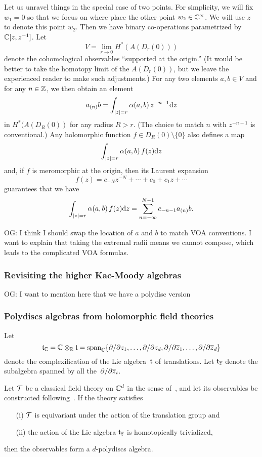 \documentclass[11pt]{amsart}
\def\owen#1{{\textcolor{violet!65!black}{OG: {#1}}}}
\begin{document}
Let us unravel things in the special case of two points.
For simplicity, we will fix $w_1 = 0$ so that we focus on where place the other point $w_2 \in \mathbb C^\times$.
We will use $z$ to denote this point $w_2$.
Then we have binary co-operations parametrized by $\mathbb C[z, z^{-1}]$.
Let 
\[
V = \lim_{r \to 0} H^*(A(D_r(0)))
\]
denote the cohomological observables ``supported at the origin.''
(It would be better to take the homotopy limit of the $A(D_r(0))$,
but we leave the experienced reader to make such adjustments.)
For any two elements $a, b \in V$ and for any $n \in \mathbb Z$,
we then obtain an element
\[
a_{(n)} b = \int_{|z| = r} \alpha(a,b)\, z^{-n-1} {\rm d} z
\]
in $H^*(A(D_R(0))$ for any radius $R > r$.
(The choice to match $n$ with $z^{-n-1}$ is conventional.)
Any holomorphic function $f \in D_R(0) \setminus \{0\}$ also defines a map
\[
\int_{|z| = r} \alpha(a,b)\, f(z) {\rm d} z 
\]
and, if $f$ is meromorphic at the origin, then its Laurent expansion
\[
f(z) = c_{-N} z^{-N} + \cdots + c_0 + c_1 z + \cdots
\]
guarantees that we have
\[
\int_{|z| = r} \alpha(a,b)\, f(z) {\rm d} z = \sum_{n=-\infty}^{N-1} c_{-n-1} a_{(n)} b.
\]

\owen{I think I should swap the location of $a$ and $b$ to match VOA conventions. I want to explain that taking the extremal radii means we cannot compose, which leads to the complicated VOA formulas.}

\subsubsection{Revisiting the higher Kac-Moody algebras}

\owen{I want to mention here that we have a polydisc version}

\subsubsection{Polydiscs algebras from holomorphic field theories}

Let 
\[
\mathfrak t_\mathbb C = \mathbb C \otimes_\mathbb R \mathfrak t = \text{span}_{\mathbb C}\{\partial/\partial z_1, \ldots, \partial/\partial z_d, \partial/\partial {\overline{z}}_1, \ldots, \partial/\partial {\overline{z}}_d  \}
\]
denote the complexification of the Lie algebra~$\mathfrak t$ of translations.
Let $\mathfrak t_{{\overline{z}}}$ denote the subalgebra spanned by all the~$\partial/\partial {\overline{z}}_i$.

\begin{thm}[\cite{CG1},\owen{precise location}]
Let $\mathcal T$ be a classical field theory on $\mathbb C^d$ in the sense of~\cite{CosBook},
and let its observables be constructed following~\cite{CG2}.
If the theory satisfies 
\begin{enumerate}
\item[(i)] $\mathcal T$ is equivariant under the action of the translation group and
\item[(ii)] the action of the Lie algebra $\mathfrak t_{{\overline{z}}}$ is homotopically trivialized,
\end{enumerate}
then the observables form a $d$-polydiscs algebra.
\end{thm}
\end{document}
